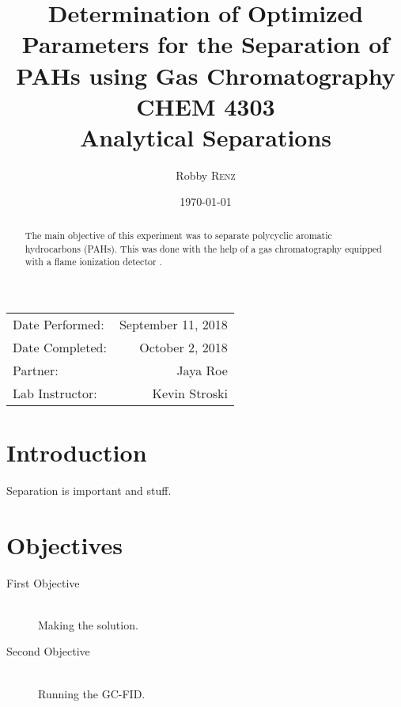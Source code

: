 \documentclass[a4paper, 12pt]{article}
\title{Determination of Optimized Parameters for the Separation of PAHs using Gas Chromatography \\ CHEM 4303 \\ Analytical Separations} %
\author{Robby \textsc{Renz}} %
\date{\today} %
\begin{document}
\maketitle %

\begin{center}
\begin{tabular}{l r}
Date Performed: & September 11, 2018 \\ %
Date Completed: & October 2, 2018 \\
Partner: & Jaya Roe \\ %
Lab Instructor: & Kevin Stroski %
\end{tabular}
\end{center}


\begin{abstract}
	The main objective of this experiment was to separate polycyclic aromatic hydrocarbons (PAHs). This was done with the help of a gas chromatography equipped with a flame ionization detector \cite{Smith:2012qr}. 
\end{abstract}

\newpage


\section{Introduction}
Separation is important and stuff.


\section{Objectives}

\begin{description}
	\item[First Objective] \hfill \\
	Making the solution.
	\item[Second Objective] \hfill \\
	Running the GC-FID.
\end{description}
 
\end{document}
